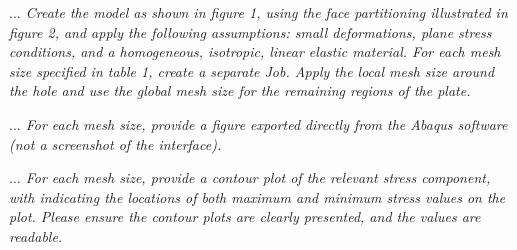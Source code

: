 \documentclass[12pt]{article}
\begin{document}
\vspace{1em}
\textit{$\dots$ Create the model as shown in figure 1, using the face partitioning illustrated in figure 2, 
and apply the following assumptions: small deformations, plane stress conditions, 
and a homogeneous, isotropic, linear elastic material. For each mesh size specified in 
table 1, create a separate Job. Apply the local mesh size around the hole and use the 
global mesh size for the remaining regions of the plate.}

\vspace{1em}
\textit{$\dots$ For each mesh size, provide a figure exported directly from the 
Abaqus software (not a screenshot of the interface).}

\vspace{1em}
\textit{$\dots$ For each mesh size, provide a contour plot of the relevant stress component, 
with indicating the locations of both maximum and minimum stress values on the plot. 
Please ensure the contour plots are clearly presented, and the values are readable.}
\end{document}

